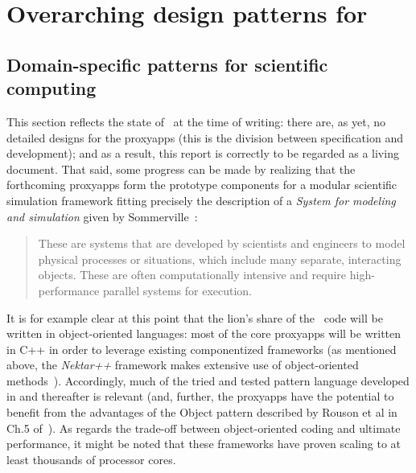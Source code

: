 \section{Overarching design patterns for \nep}\label{sec:overarchpat}

\subsection{Domain-specific patterns for scientific computing}

This section reflects the state of \nep\ at the time of writing: there are, as
yet, no detailed designs for the proxyapps (this is the division between
specification and development); and as a result, this report is correctly to
be regarded as a living document.
That said, some progress can be made by realizing that the forthcoming
proxyapps form the prototype components for a modular scientific simulation
framework fitting precisely the description of a {\it System for modeling and
simulation} given by Sommerville~\cite{sommerville}:

\begin{quote}
These are systems that are developed by
scientists and engineers to model physical processes or situations, which include
many separate, interacting objects. These are often computationally intensive
and require high-performance parallel systems for execution.
\end{quote}

It is for example clear at this point that the lion's share of the \nep\ code
will be written in object-oriented languages: most of the core proxyapps will
be written in C++ in order to leverage existing componentized frameworks (as
mentioned above, the {\it Nektar++} framework makes extensive use of
object-oriented methods~\cite{Mo20Nekt}).
Accordingly, much of the tried and tested pattern language developed in
\cite{gammahelmjohnsonvlissides} and thereafter is relevant (and, further,
the proxyapps have the potential to benefit from the advantages of the Object
pattern described by Rouson et al in Ch.5 of~\cite{rousonxiaxu}).  
As regards the trade-off between object-oriented coding and ultimate
performance, it might be noted that these frameworks have proven scaling to
at least thousands of processor cores.

